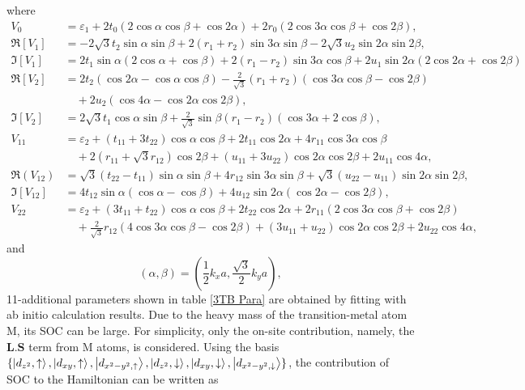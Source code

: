 \documentclass[12pt,english,a4paper]{article}
\begin{document}
where
	\begin{align*}
		V_0 &= \varepsilon_1 + 2t_0 (2\cos\alpha\cos\beta + \cos2\alpha) + 2r_0 (2\cos3\alpha\cos\beta+\cos2\beta),\\
		\Re[V_1]&= -2\sqrt{3}t_2 \sin \alpha \sin \beta + 2(r_1 + r_2)\sin 3 \alpha \sin \beta - 2\sqrt{3} u_2 \sin 2\alpha \sin 2\beta,\\
		\Im[V_1] &= 2 t_1 \sin \alpha (2 \cos \alpha +\cos \beta) + 2(r_1 - r_2) \sin 3\alpha \cos \beta + 2u_1 \sin 2\alpha (2\cos 2\alpha + \cos 2\beta)\\
		\Re[V_2] &= 2t_2 (\cos 2\alpha - \cos \alpha \cos \beta) -\frac{2}{\sqrt{3}} (r_1 + r_2 ) (\cos 3\alpha \cos \beta - \cos 2 \beta) \\&\quad + 2u_2 (\cos 4\alpha -\cos 2\alpha \cos 2\beta),\\
		\Im[V_2] &= 2\sqrt{3} t_1 \cos \alpha \sin \beta +\frac{2}{\sqrt{3}} \sin \beta (r_1 -r_2 )(\cos 3\alpha + 2\cos \beta),\\
		V_{11} & = \varepsilon_2 + (t_{11}+3t_{22})\cos \alpha \cos \beta + 2 t_{11} \cos 2\alpha + 4r_{11} \cos 3\alpha \cos \beta \\ &\quad +2 (r_{11} + \sqrt{3} r_{12}) \cos 2\beta + (u_{11} + 3 u_{22})\cos 2 \alpha \cos 2\beta + 2 u_{11} \cos 4\alpha,\\
		\Re(V_{12}) &= \sqrt{3} (t_{22} - t_{11}) \sin \alpha \sin \beta +4 r_{12} \sin 3\alpha \sin \beta + \sqrt{3} (u_{22} - u_{11}) \sin 2\alpha \sin 2\beta,\\
		\Im[V_{12}] &= 4 t_{12} \sin \alpha (\cos \alpha -\cos \beta) + 4u_{12} \sin 2\alpha (\cos 2\alpha - \cos 2\beta),\\
		V_{22} &= \varepsilon_2 +(3t_{11} + t_{22}) \cos \alpha \cos \beta + 2 t_{22} \cos 2 \alpha + 2 r_{11}(2\cos 3\alpha \cos \beta + \cos 2 \beta) \\&\quad + \frac{2}{\sqrt{3}} r_{12} (4\cos 3\alpha \cos \beta - \cos 2\beta) + (3 u_{11} + u_{22}) \cos 2\alpha \cos 2\beta + 2u_{22} \cos 4\alpha,
		\end{align*}
and
		\begin{equation}		
			(\alpha,\beta) =  (\frac{1}{2}k_x a, \frac{\sqrt{3}}{2}k_y a),
		\end{equation}
11-additional parameters shown in table \ref{3TB Para} are obtained by fitting with ab initio calculation results. Due to the heavy mass of the transition-metal atom M, its \ac{SOC} can be large. For simplicity, only the on-site contribution, namely, the $\textbf{L}.\textbf{S}$ term from M atoms, is considered. Using the basis $\{\ket{d_{z^2},\uparrow},\ket{d_{xy},\uparrow},\ket{d_{x^2-y^2,\uparrow}},\ket{d_{z^2},\downarrow},\ket{d_{xy},\downarrow},\ket{d_{x^2-y^2,\downarrow}}\}$, the contribution of SOC to the Hamiltonian can be written as
\end{document}
